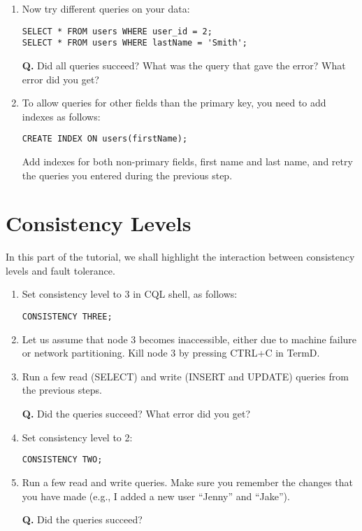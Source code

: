 \documentclass[a4paper,12pt]{article}
\newcounter{question}
\newcommand{\question}{%
	\stepcounter{question}%
	\textbf{Q\thequestion. }}
\begin{document}
\begin{enumerate}
	\item Now try different queries on your data:
\begin{lstlisting}
SELECT * FROM users WHERE user_id = 2;
SELECT * FROM users WHERE lastName = 'Smith';
\end{lstlisting}
		\question Did all queries succeed? What was the query that gave the error? What error did you get?

	\item To allow queries for other fields than the primary key, you need to add indexes as follows:
\begin{lstlisting}
CREATE INDEX ON users(firstName);
\end{lstlisting}

		Add indexes for both non-primary fields, first name and last name, and retry the queries you entered during the previous step.

\end{enumerate}

\section{Consistency Levels}

In this part of the tutorial, we shall highlight the interaction between consistency levels and fault tolerance.

\begin{enumerate}
	\item Set consistency level to 3 in CQL shell, as follows:
\begin{lstlisting}
CONSISTENCY THREE;
\end{lstlisting}

	\item Let us assume that node 3 becomes inaccessible, either due to machine failure or network partitioning. Kill node 3 by pressing CTRL+C in TermD.

	\item Run a few read (SELECT) and write (INSERT and UPDATE) queries from the previous steps.
	
	\question Did the queries succeed? What error did you get?

	\item Set consistency level to 2:
\begin{lstlisting}
CONSISTENCY TWO;
\end{lstlisting}
		
	\item Run a few read and write queries. Make sure you remember the changes that you have made (e.g., I added a new user ``Jenny'' and ``Jake'').
	
	\question Did the queries succeed?

\end{enumerate}
\end{document}
